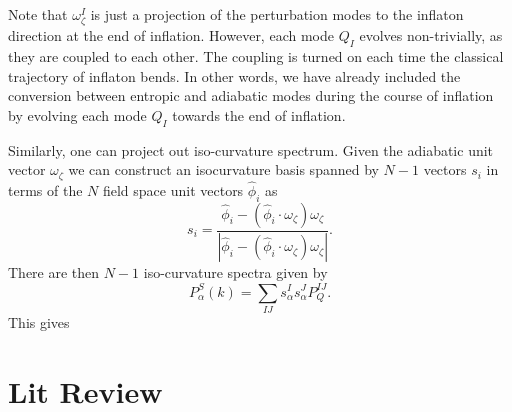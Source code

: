 \documentclass[11pt]{article}
\begin{document}
Note that $\omega_\zeta^I$ is just a projection of the perturbation modes to the inflaton direction at the end of inflation. However, each mode $Q_I$ evolves non-trivially, as they are coupled to each other. The coupling is turned on each time the classical trajectory of inflaton bends. In other words, we have already included the conversion between entropic and adiabatic modes during the course of inflation by evolving each mode $Q_I$ towards the end of inflation. 

Similarly, one can project out iso-curvature spectrum.  Given the adiabatic unit vector $\omega_\zeta$ we can construct an isocurvature basis spanned by $N-1$ vectors $s_i$ in terms of the $N$ field space unit vectors $\hat \phi_i$ as
\begin{equation}
  s_i = \frac{\hat \phi_i - (\hat \phi_i \cdot \omega_\zeta) \omega_\zeta}{|\hat \phi_i - (\hat \phi_i \cdot \omega_\zeta) \omega_\zeta|}.
  \label{eqn:XXX}
\end{equation}
There are then $N-1$ iso-curvature spectra given by
\begin{equation}
  P_{\alpha}^S (k) = \sum_{IJ} s_\alpha^I s_\alpha^J P_Q^{IJ}.
\end{equation}
This gives 

\section{Lit Review}
\end{document}
